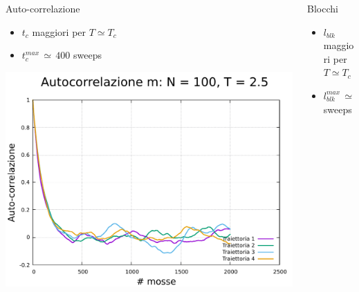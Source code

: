\begin{frame}
\begin{columns}
        \begin{column}{0.33\textwidth}
            \begin{block}{Auto-correlazione}

                \begin{itemize}[itemsep=0.5em, label=$\diamond$]
                    \item $t_{c}$ maggiori per $T \simeq T_c$
                    \item $t_{c}^{max}\,\simeq\,400$ sweeps
                \end{itemize}

                \vspace{0.5cm}

                \centering
                \includegraphics[width=\textwidth]{Immagini/simIsing2D/auto_100_2.5.pdf}
            
            \end{block}
        \end{column}

        \begin{column}{0.33\textwidth}
            \begin{block}{Blocchi}

                \begin{itemize}[itemsep=0.5em, label=$\diamond$]
                    \item $l_{blk}$ maggiori per $T \simeq T_c$
                    \item $l_{blk}^{max}\,\simeq\,1000$ sweeps
                \end{itemize}


\end{block}
\end{column}
\end{columns}
\end{frame}
